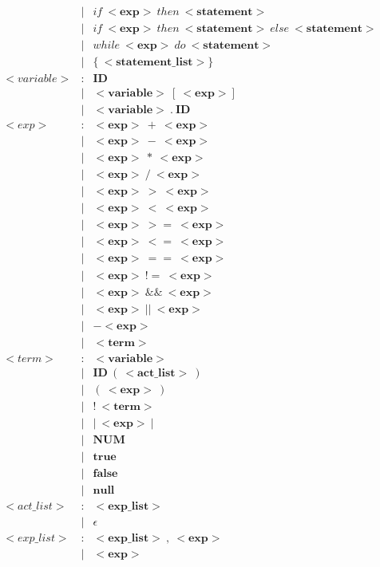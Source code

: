 \documentclass{article}
\begin{document}
\begin{align*}
    & | & if\ <\boldsymbol{exp}>\ then\ <\boldsymbol{statement}>\ \\
    & | & if\ <\boldsymbol{exp}>\ then\ <\boldsymbol{statement}>\ else\ <\boldsymbol{statement}> \\
    & | & while\ <\boldsymbol{exp}>\ do\ <\boldsymbol{statement}>\ \\
    & | & \{\ <\boldsymbol{statement\_list}>\} \\
    <variable> & : & \boldsymbol{ID} \\
    & | & <\boldsymbol{variable}>\ [\ <\boldsymbol{exp}>] \\
    & | & <\boldsymbol{variable}>\ .\ \boldsymbol{ID}\\
    <exp>& : & <\boldsymbol{exp}>\ +\ <\boldsymbol{exp}> \\
    & | & <\boldsymbol{exp}>\ -\ <\boldsymbol{exp}>\ \\
    & | & <\boldsymbol{exp}>\ *\ <\boldsymbol{exp}>\ \\
    & | & <\boldsymbol{exp}>\ /\ <\boldsymbol{exp}>\ \\
    & | & <\boldsymbol{exp}>\ >\ <\boldsymbol{exp}>\ \\
    & | & <\boldsymbol{exp}>\ <\ <\boldsymbol{exp}>\ \\
    & | & <\boldsymbol{exp}>\ >=\ <\boldsymbol{exp}>\ \\
    & | & <\boldsymbol{exp}>\ <=\ <\boldsymbol{exp}>\ \\
    & | & <\boldsymbol{exp}>\ ==\ <\boldsymbol{exp}>\ \\
    & | & <\boldsymbol{exp}>\ !=\ <\boldsymbol{exp}>\ \\
    & | & <\boldsymbol{exp}>\ \&\&\ <\boldsymbol{exp}>\ \\
    & | & <\boldsymbol{exp}>\ ||\ <\boldsymbol{exp}>\ \\
    & | & -<\boldsymbol{exp}>\ \\
    & | & <\boldsymbol{term}>\ \\
    <term> & : & <\boldsymbol{variable}> \\
    & | & \boldsymbol{ID}\ (\ <\boldsymbol{act\_list}>\ ) \\
    & | & (\ <\boldsymbol{exp}>\ ) \\
    & | & !\ <\boldsymbol{term}> \\
    & | & |\ <\boldsymbol{exp}>\ | \\
    & | & \boldsymbol{NUM}	\\
    & | & \boldsymbol{true} \\
    & | & \boldsymbol{false} \\
    & | & \boldsymbol{null} \\
    <act\_list> & : & <\boldsymbol{exp\_list}> \\
    & | & \epsilon \\
    <exp\_list> & : & <\boldsymbol{exp\_list}>\ ,\ <\boldsymbol{exp}> \\
    & | & <\boldsymbol{exp}>
    \end{align*}
    
\end{document}
